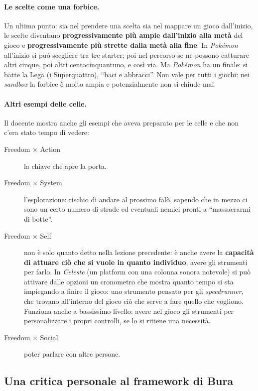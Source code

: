 \paragraph{Le scelte come una forbice.} Un ultimo punto: sia nel prendere una
scelta sia nel mappare un gioco dall'inizio, le scelte diventano
\textbf{progressivamente più ampie dall'inizio alla metà} del gioco e
\textbf{progressivamente più strette dalla metà alla fine}. In
\emph{Pokémon} all'inizio si può scegliere tra tre starter; poi nel percorso
se ne possono catturare altri cinque, poi altri centocinquantuno, e così via.
Ma \emph{Pokémon} ha un finale: si batte la Lega (i Superquattro), ``baci e
abbracci''. Non vale per tutti i giochi: nei \emph{sandbox} la forbice è
molto ampia e potenzialmente non si chiude mai.

\paragraph{Altri esempi delle celle.} Il docente mostra anche gli esempi che
aveva preparato per le celle e che non c'era stato tempo di vedere:
\begin{description}
  \item[Freedom $\times$ Action] la chiave che apre la porta.
  \item[Freedom $\times$ System] l'esplorazione: rischio di andare al
        prossimo falò, sapendo che in mezzo ci sono un certo numero di strade
        ed eventuali nemici pronti a ``massacrarmi di botte''.
  \item[Freedom $\times$ Self] non è solo quanto detto nella lezione
        precedente: è anche avere la \textbf{capacità di attuare ciò che si
        vuole in quanto individuo}, avere gli strumenti per farlo. In
        \emph{Celeste} (un platform con una colonna sonora notevole) si può
        attivare dalle opzioni un cronometro che mostra quanto tempo si sta
        impiegando a finire il gioco: uno strumento pensato per gli
        \emph{speedrunner}, che trovano all'interno del gioco ciò che serve a
        fare quello che vogliono. Funziona anche a bassissimo livello: avere
        nel gioco gli strumenti per personalizzare i propri controlli, se lo
        si ritiene una necessità.
  \item[Freedom $\times$ Social] poter parlare con altre persone.
\end{description}

\subsection{Una critica personale al framework di Bura}

